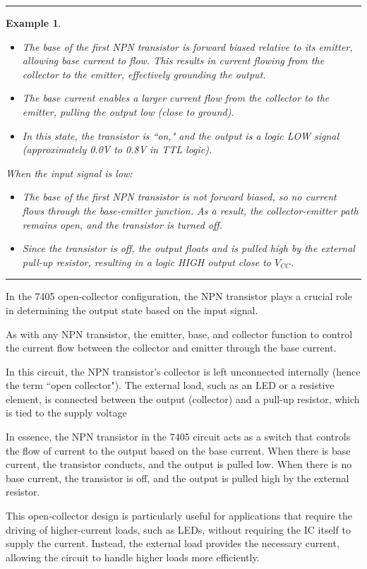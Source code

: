 \documentclass[12pt]{report}
\newtheorem{example}{Example}
\newenvironment{examp}
{\vspace{0.5cm}
\hrule
\begin{example}}
{\hrule
\vspace{0.5cm}
\end{example}}
\begin{document}
\begin{examp}
\begin{itemize}
		\item The base of the first NPN transistor is forward biased relative to its emitter, allowing base current to flow. This results in current flowing from the collector to the emitter, effectively grounding the output.
		\item The base current enables a larger current flow from the collector to the emitter, pulling the output low (close to ground).
		\item In this state, the transistor is ``on," and the output is a logic LOW signal (approximately 0.0V to 0.8V in TTL logic).
	\end{itemize}
	\pagebreak
	\textnormal{When the input signal is low:}
	\begin{itemize}
		\item The base of the first NPN transistor is not forward biased, so no current flows through the base-emitter junction. As a result, the collector-emitter path remains open, and the transistor is turned off.
		\item Since the transistor is off, the output floats and is pulled high by the external pull-up resistor, resulting in a logic HIGH output close to \(V_{CC}\).
	\end{itemize}
\end{examp}
In the 7405 open-collector configuration, the NPN transistor plays a crucial role in determining the output state based on the input signal.

As with any NPN transistor, the emitter, base, and collector function to control the current flow between the collector and emitter through the base current.

In this circuit, the NPN transistor's collector is left unconnected internally (hence the term ``open collector"). The external load, such as an LED or a resistive element, is connected between the output (collector) and a pull-up resistor, which is tied to the supply voltage

In essence, the NPN transistor in the 7405 circuit acts as a switch that controls the flow of current to the output based on the base current. When there is base current, the transistor conducts, and the output is pulled low. When there is no base current, the transistor is off, and the output is pulled high by the external resistor.

This open-collector design is particularly useful for applications that require the driving of higher-current loads, such as LEDs, without requiring the IC itself to supply the current. Instead, the external load provides the necessary current, allowing the circuit to handle higher loads more efficiently.
\end{document}

